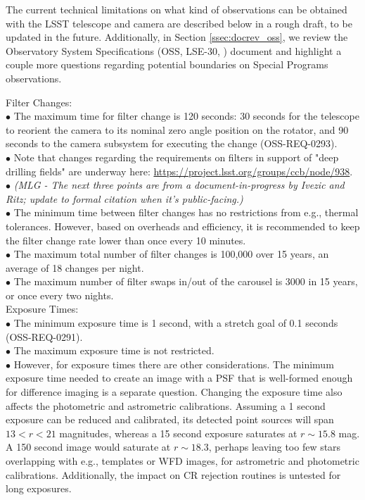 \documentclass[DM,lsstdraft,toc]{lsstdoc}
\begin{document}
The current technical limitations on what kind of observations can be obtained with the LSST telescope and camera are described below in a rough draft, to be updated in the future. Additionally, in Section \ref{ssec:docrev_oss}, we review the Observatory System Specifications (OSS, LSE-30, \cite{LSE-30}) document and highlight a couple more questions regarding potential boundaries on Special Programs observations.

Filter Changes: \\
$\bullet$ The maximum time for filter change is 120 seconds: 30 seconds for the telescope to reorient the camera to its nominal zero angle position on the rotator, and 90 seconds to the camera subsystem for executing the change (OSS-REQ-0293). \\
$\bullet$ Note that changes regarding the requirements on filters in support of "deep drilling fields" are underway here: \url{https://project.lsst.org/groups/ccb/node/938}.
$\bullet$ \textit{(MLG - The next three points are from a document-in-progress by Ivezic and Ritz; update to formal citation when it's public-facing.)} \\
$\bullet$ The minimum time between filter changes has no restrictions from e.g., thermal tolerances. However, based on overheads and efficiency, it is recommended to keep the filter change rate lower than once every 10 minutes. \\
$\bullet$ The maximum total number of filter changes is 100,000 over 15 years, an average of 18 changes per night. \\
$\bullet$ The maximum number of filter swaps in/out of the carousel is 3000 in 15 years, or once every two nights. \\

Exposure Times: \\
$\bullet$ The minimum exposure time is 1 second, with a stretch goal of 0.1 seconds (OSS-REQ-0291). \\
$\bullet$ The maximum exposure time is not restricted. \\
$\bullet$ However, for exposure times there are other considerations. The minimum exposure time needed to create an image with a PSF that is well-formed enough for difference imaging is a separate question. Changing the exposure time also affects the photometric and astrometric calibrations. Assuming a 1 second exposure can be reduced and calibrated, its detected point sources will span $13 < r < 21$ magnitudes, whereas a 15 second exposure saturates at $r\sim15.8$ mag. A 150 second image would saturate at $r\sim18.3$, perhaps leaving too few stars overlapping with e.g., templates or WFD images, for astrometric and photometric calibrations. Additionally, the impact on CR rejection routines is untested for long exposures.
\end{document}
